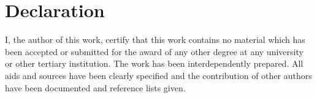 
\chapter{Declaration}

\thispagestyle{empty}
\begingroup
\let\clearpage\relax
\let\cleardoublepage\relax
\let\cleardoublepage\relax
\thispagestyle{empty}


I, the author of this work, certify that this work contains no material which has been accepted or submitted for the award of any other degree at any university or other tertiary institution.
The work has been interdependently prepared. 
All aids and sources have been clearly specified and the contribution of other authors have been documented and reference lists given.



\signature{Eduard Szöcs}

\vfill

\endgroup
